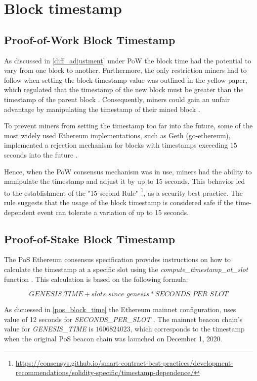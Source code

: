 \section{Block timestamp}
\subsection{Proof-of-Work Block Timestamp}
As discussed in \ref{diff_adjustment} under PoW the block time had the
potential to vary from one block to another. Furthermore, the only restriction
miners had to follow when setting the block timestamp value was outlined in the
yellow paper, which regulated that the timestamp of the new block must be
greater than the timestamp of the parent block \cite{ethyellowpaper2023}.
Consequently, miners could gain an unfair advantage by manipulating the
timestamp of their mined block \cite{swc116}.

To prevent miners from setting the timestamp too far into the future, some of
the most widely used Ethereum implementations, such as Geth (go-ethereum),
implemented a rejection mechanism for blocks with timestamps exceeding 15
seconds into the future \cite{go-ethereum-15-sek-limit}.

Hence, when the PoW consensus mechanism was in use, miners had the ability to
manipulate the timestamp and adjust it by up to 15 seconds. This behavior led
to the establishment of the "15-second Rule"
\footnote{\url{https://consensys.github.io/smart-contract-best-practices/development-recommendations/solidity-specific/timestamp-dependence/}},
as a security best practice. The
rule suggests that the usage of the block timestamp is considered
safe if the time-dependent event can tolerate a variation of up to 15 seconds.

\subsection{Proof-of-Stake Block Timestamp}

The PoS Ethereum consensus specification provides instructions on how to
calculate the timestamp at a specific slot using the
\textit{compute\_timestamp\_at\_slot} function \cite{compute-timestamp-at-slot}.
This calculation is based on the following formula:

\begin{equation}
GENESIS\_TIME + slots\_since\_genesis *
SECONDS\_PER\_SLOT
\end{equation}


As dicuessed in \ref{pos_block_time} the Ethereum mainnet configuration, uses
value of 12 seconds for \textit{SECONDS\_PER\_SLOT}
\cite{seconds-per-slot-mainnet} \cite{seconds-per-slot-mainnet-doc}.
The mainnet beacon chain's value for \textit{GENESIS\_TIME} is $1606824023$, which
corresponds to the timestamp when the original PoS beacon chain was launched on
December 1, 2020.

